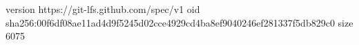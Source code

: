 version https://git-lfs.github.com/spec/v1
oid sha256:00f6df08ae11ad4d9f5245d02cce4929cd4ba8ef9040246ef281337f5db829c0
size 6075
